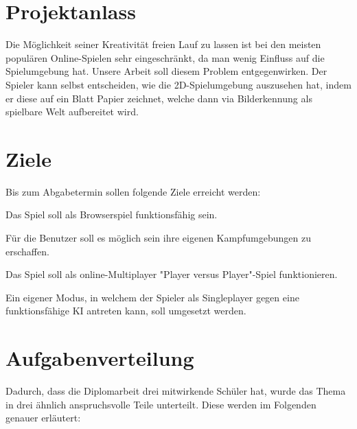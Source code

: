 \section{Projektanlass}
Die Möglichkeit seiner Kreativität freien Lauf zu lassen ist bei den meisten populären
Online-Spielen sehr eingeschränkt, da man wenig Einfluss auf die Spielumgebung hat.
Unsere Arbeit soll diesem Problem entgegenwirken. Der Spieler kann selbst entscheiden,
wie die 2D-Spielumgebung auszusehen hat, indem er diese auf ein Blatt Papier zeichnet,
welche dann via Bilderkennung als spielbare Welt aufbereitet wird.

\section{Ziele}
Bis zum Abgabetermin sollen folgende Ziele erreicht werden:
\begin{compactitem}
    \item Das Spiel soll als Browserspiel funktionsfähig sein.
    \item Für die Benutzer soll es möglich sein ihre eigenen Kampfumgebungen zu erschaffen.
    \item Das Spiel soll als online-Multiplayer "Player versus Player"-Spiel funktionieren.
    \item Ein eigener Modus, in welchem der Spieler als Singleplayer gegen eine funktionsfähige KI antreten kann, soll umgesetzt werden.
\end{compactitem}

\section{Aufgabenverteilung}
Dadurch, dass die Diplomarbeit drei mitwirkende Schüler hat, wurde das Thema in drei ähnlich
anspruchsvolle Teile unterteilt. Diese werden im Folgenden genauer erläutert:

